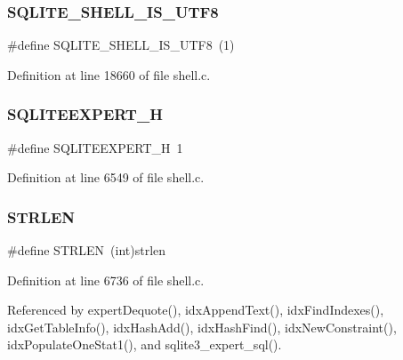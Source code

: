 \mbox{\label{shell_8c_a11075a4a9ce04cbcb7fa17d111dc016a}} 
\subsubsection{S\+Q\+L\+I\+T\+E\+\_\+\+S\+H\+E\+L\+L\+\_\+\+I\+S\+\_\+\+U\+T\+F8}
{\footnotesize\ttfamily \#define S\+Q\+L\+I\+T\+E\+\_\+\+S\+H\+E\+L\+L\+\_\+\+I\+S\+\_\+\+U\+T\+F8~(1)}



Definition at line 18660 of file shell.\+c.

\mbox{\label{shell_8c_af417b58f69df430b1d1fdb791cbd22e4}} 
\subsubsection{S\+Q\+L\+I\+T\+E\+E\+X\+P\+E\+R\+T\+\_\+H}
{\footnotesize\ttfamily \#define S\+Q\+L\+I\+T\+E\+E\+X\+P\+E\+R\+T\+\_\+H~1}



Definition at line 6549 of file shell.\+c.

\mbox{\label{shell_8c_a278cf415676752815cfb411cb0b32802}} 
\subsubsection{S\+T\+R\+L\+EN}
{\footnotesize\ttfamily \#define S\+T\+R\+L\+EN~(int)strlen}



Definition at line 6736 of file shell.\+c.



Referenced by expert\+Dequote(), idx\+Append\+Text(), idx\+Find\+Indexes(), idx\+Get\+Table\+Info(), idx\+Hash\+Add(), idx\+Hash\+Find(), idx\+New\+Constraint(), idx\+Populate\+One\+Stat1(), and sqlite3\+\_\+expert\+\_\+sql().

\mbox{\label{shell_8c_a04c94872ca0f49899c5d650e0445eddc}} 
